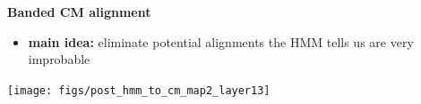 \documentclass[landscape]{slides}
\begin{document}
\begin{slide}
\begin{center}
\large
\textbf{Banded CM alignment}
\end{center}
\medskip
\small
\begin{itemize}
\item
\textbf{main idea:} eliminate potential alignments the HMM tells us are very improbable
\end{itemize}
\begin{center}
\texttt{[image: figs/post\_hmm\_to\_cm\_map2\_layer13]}
\end{center}
\vfill
\end{slide}
\end{document}
